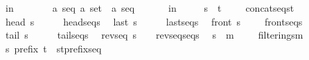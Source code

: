 \begin{isabellebody}
\ \ {\isachardoublequoteopen}{\isacharasterisk}in{\isachardoublequoteclose}\ \ \ \ \ \ \ \ {\isacharcolon}{\isacharcolon}{\isachardoublequoteopen}{\isacharbrackleft}{\isacharprime}a\ seq{\isacharcomma}\ {\isacharprime}a\ set{\isacharbrackright}\ {\isacharequal}{\isachargreater}\ {\isacharprime}a\ seq{\isachardoublequoteclose}\ \ \ \ \ {\isacharparenleft}{\isachardoublequoteopen}{\isacharparenleft}{}\ {\isacharunderscore}\ in{\isacharslash}\ {\isacharunderscore}{\isacharparenright}{\isachardoublequoteclose}\ {\isacharbrackleft}{}{}{\isacharcomma}{}{}{\isacharbrackright}\ {}{}{\isacharparenright}\isanewline
\isanewline
\isanewline
\isanewline
\isanewline
{}\isamarkupfalse%
\isanewline
\ \ {\isachardoublequoteopen}s\ {\isacharpercent}{\isacharampersand}{\isacharcircum}\ t{\isachardoublequoteclose}\ \ \ \ {\isacharequal}{\isacharequal}\ {\isachardoublequoteopen}concatseq{\isacharpercent}{\isacharcircum}{\isacharparenleft}s{\isacharcomma}t{\isacharparenright}{\isachardoublequoteclose}\isanewline
\ \ {\isachardoublequoteopen}head\ s{\isachardoublequoteclose}\ \ \ \ \ {\isacharequal}{\isacharequal}\ {\isachardoublequoteopen}headseq{\isacharpercent}{\isacharcircum}s{\isachardoublequoteclose}\isanewline
\ \ {\isachardoublequoteopen}last\ s{\isachardoublequoteclose}\ \ \ \ \ {\isacharequal}{\isacharequal}\ {\isachardoublequoteopen}lastseq{\isacharpercent}{\isacharcircum}s{\isachardoublequoteclose}\isanewline
\ \ {\isachardoublequoteopen}front\ s{\isachardoublequoteclose}\ \ \ \ {\isacharequal}{\isacharequal}\ {\isachardoublequoteopen}frontseq{\isacharpercent}{\isacharcircum}s{\isachardoublequoteclose}\isanewline
\ \ {\isachardoublequoteopen}tail\ s{\isachardoublequoteclose}\ \ \ \ \ {\isacharequal}{\isacharequal}\ {\isachardoublequoteopen}tailseq{\isacharpercent}{\isacharcircum}s{\isachardoublequoteclose}\isanewline
\ \ {\isachardoublequoteopen}revseq\ s{\isachardoublequoteclose}\ \ \ {\isacharequal}{\isacharequal}\ {\isachardoublequoteopen}revseqseq{\isacharpercent}{\isacharcircum}s{\isachardoublequoteclose}\isanewline
\ \ {\isachardoublequoteopen}s\ {\isacharpercent}{\isacharbar}{\isacharbackquote}\ m{\isachardoublequoteclose}\ \ \ \ {\isacharequal}{\isacharequal}\ {\isachardoublequoteopen}filtering{\isacharpercent}{\isacharcircum}{\isacharparenleft}s{\isacharcomma}m{\isacharparenright}{\isachardoublequoteclose}\isanewline
\ \ {\isachardoublequoteopen}s\ prefix\ t{\isachardoublequoteclose}\ {\isacharequal}{\isacharequal}\ {\isachardoublequoteopen}{\isacharparenleft}s{\isacharcomma}t{\isacharparenright}{\isacharcolon}prefixseq{\isachardoublequoteclose}\isanewline

\end{isabellebody}
